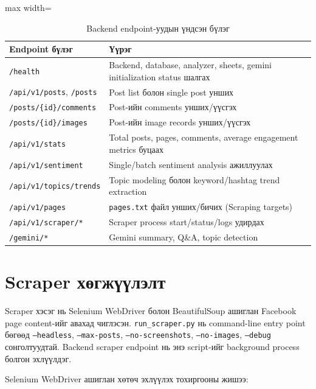 \begin{table}[H]
\centering
\caption{Backend endpoint-уудын үндсэн бүлэг}
\small
\renewcommand{\arraystretch}{1.25}
\begin{adjustbox}{max width=\textwidth}
\begin{tabular}{|p{4.4cm}|p{9.2cm}|}
\hline
\rowcolor{gray!20}\textbf{Endpoint бүлэг} & \textbf{Үүрэг} \\
\hline
\texttt{/health} & Backend, database, analyzer, sheets, gemini initialization status шалгах \\
\hline
\texttt{/api/v1/posts}, \texttt{/posts} & Post list болон single post унших \\
\hline
\texttt{/posts/\{id\}/comments} & Post-ийн comments унших/үүсгэх \\
\hline
\texttt{/posts/\{id\}/images} & Post-ийн image records унших/үүсгэх \\
\hline
\texttt{/api/v1/stats} & Total posts, pages, comments, average engagement metrics буцаах \\
\hline
\texttt{/api/v1/sentiment} & Single/batch sentiment analysis ажиллуулах \\
\hline
\texttt{/api/v1/topics/trends} & Topic modeling болон keyword/hashtag trend extraction \\
\hline
\texttt{/api/v1/pages} & \texttt{pages.txt} файл унших/бичих (Scraping targets) \\
\hline
\texttt{/api/v1/scraper/*} & Scraper process start/status/logs удирдах \\
\hline
\texttt{/gemini/*} & Gemini summary, Q\&A, topic detection \\
\hline
\end{tabular}
\end{adjustbox}
\normalsize
\end{table}

\section{Scraper хөгжүүлэлт}

Scraper хэсэг нь Selenium WebDriver болон BeautifulSoup ашиглан Facebook page content-ийг авахад чиглэсэн. \texttt{run\_scraper.py} нь command-line entry point бөгөөд \texttt{--headless}, \texttt{--max-posts}, \texttt{--no-screenshots}, \texttt{--no-images}, \texttt{--debug} сонголтуудтай. Backend scraper endpoint нь энэ script-ийг background process болгон эхлүүлдэг.

Selenium WebDriver ашиглан хөтөч эхлүүлэх тохиргооны жишээ:

